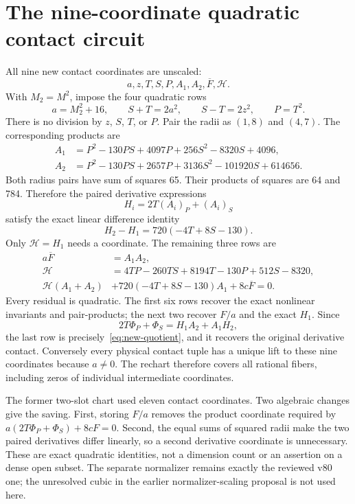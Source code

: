 \documentclass[11pt,a4paper]{article}
\begin{document}
\section{The nine-coordinate quadratic contact circuit}\label{sec:contact-circuit}

All nine new contact coordinates are unscaled:
\[
                  a,z,T,S,P,A_1,A_2,\overline F,\mathcal H.
\]
With $M_2=M^2$, impose the four quadratic rows
\[
 a=M_2^2+16,\qquad S+T=2a^2,\qquad S-T=2z^2,\qquad P=T^2.
\]
There is no division by $z$, $S$, $T$, or $P$.
Pair the radii as $(1,8)$ and $(4,7)$. The corresponding products are
\[
\begin{aligned}
 A_1&=P^2-130PS+4097P+256S^2-8320S+4096,\\
 A_2&=P^2-130PS+2657P+3136S^2-101920S+614656.
\end{aligned}
\]
Both radius pairs have sum of squares 65. Their products of squares are
64 and 784. Therefore the paired derivative expressions
\[
 H_i=2T(A_i)_P+(A_i)_S
\]
satisfy the exact linear difference identity
\[
 H_2-H_1=720(-4T+8S-130).
\]
Only $\mathcal H=H_1$ needs a coordinate. The remaining three rows are
\begin{align*}
 a\overline F&=A_1A_2,\\
 \mathcal H&=4TP-260TS+8194T-130P+512S-8320,\\
 \mathcal H(A_1+A_2)&+720(-4T+8S-130)A_1+8c\overline F=0.
\end{align*}
Every residual is quadratic. The first six rows recover the exact
nonlinear invariants and pair-products; the next two recover $F/a$
and the exact $H_1$. Since
\[
 2T\Phi_P+\Phi_S=H_1A_2+A_1H_2,
\]
the last row is precisely~\eqref{eq:new-quotient}, and it recovers the
original derivative contact. Conversely every physical contact tuple
has a unique lift to these nine coordinates because $a\ne0$.
The rechart therefore covers all rational fibers, including zeros of
individual intermediate coordinates.

The former two-slot chart used eleven contact coordinates. Two algebraic
changes give the saving. First, storing $F/a$ removes the product
coordinate required by $a(2T\Phi_P+\Phi_S)+8cF=0$. Second, the equal
sums of squared radii make the two paired derivatives differ linearly,
so a second derivative coordinate is unnecessary. These are exact
quadratic identities, not a dimension count or an assertion on a dense
open subset. The separate normalizer remains exactly the reviewed v80
one; the unresolved cubic in the earlier normalizer-scaling proposal is
not used here.
\end{document}

